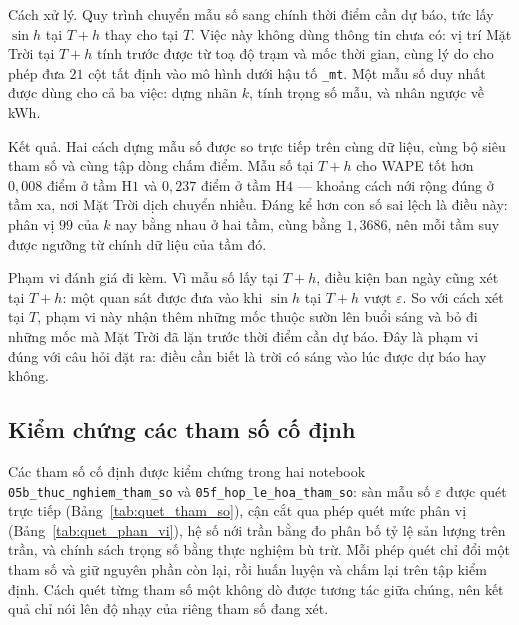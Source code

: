 \documentclass[12pt, a4paper]{report}
\begin{document}
Cách xử lý. Quy trình chuyển mẫu số sang chính thời điểm cần dự báo, tức lấy
$\sin h$ tại $T+h$ thay cho tại $T$. Việc này không dùng thông tin chưa có: vị trí Mặt Trời
tại $T+h$ tính trước được từ toạ độ trạm và mốc thời gian, cùng lý do cho phép đưa $21$ cột
tất định vào mô hình dưới hậu tố \texttt{\_mt}. Một mẫu số duy nhất được dùng cho cả ba việc:
dựng nhãn $k$, tính trọng số mẫu, và nhân ngược về kWh.

Kết quả. Hai cách dựng mẫu số được so trực tiếp trên cùng dữ liệu, cùng bộ siêu tham
số và cùng tập dòng chấm điểm. Mẫu số tại $T+h$ cho WAPE tốt hơn $0{,}008$ điểm ở tầm H$1$ và
$0{,}237$ điểm ở tầm H$4$ --- khoảng cách nới rộng đúng ở tầm xa, nơi Mặt Trời dịch chuyển
nhiều. Đáng kể hơn con số sai lệch là điều này: phân vị $99$ của $k$ nay bằng nhau ở hai tầm,
cùng bằng $1{,}3686$, nên mỗi tầm suy được ngưỡng từ chính dữ liệu của tầm đó.

Phạm vi đánh giá đi kèm. Vì mẫu số lấy tại $T+h$, điều kiện ban ngày cũng xét tại
$T+h$: một quan sát được đưa vào khi $\sin h$ tại $T+h$ vượt $\varepsilon$. So với cách xét
tại $T$, phạm vi này nhận thêm những mốc thuộc sườn lên buổi sáng và bỏ đi những mốc mà Mặt
Trời đã lặn trước thời điểm cần dự báo. Đây là phạm vi đúng với câu hỏi đặt ra: điều cần biết
là trời có sáng vào lúc được dự báo hay không.

\FloatBarrier
\subsection{Kiểm chứng các tham số cố định}

Các tham số cố định được kiểm chứng trong hai notebook
\texttt{05b\_thuc\_nghiem\_tham\_so} và \texttt{05f\_hop\_le\_hoa\_tham\_so}: sàn mẫu số
$\varepsilon$ được quét trực tiếp (Bảng~\ref{tab:quet_tham_so}), cận cắt qua phép quét mức
phân vị (Bảng~\ref{tab:quet_phan_vi}), hệ số nới trần bằng đo phân bố tỷ lệ sản lượng trên
trần, và chính sách trọng số bằng thực nghiệm bù trừ. Mỗi phép quét chỉ đổi một tham số và giữ nguyên phần còn
lại, rồi huấn luyện và chấm lại trên tập kiểm định. Cách quét từng tham số một không dò được
tương tác giữa chúng, nên kết quả chỉ nói lên độ nhạy của riêng tham số đang xét.
\end{document}
